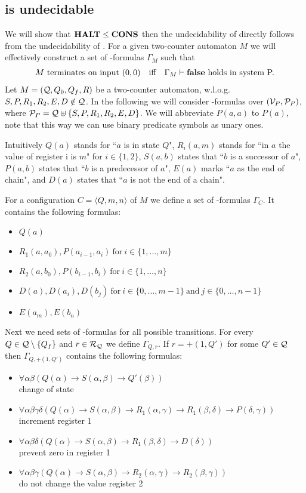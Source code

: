 \subsection{\PCons{} is undecidable}
We will show that $\textbf{HALT}\leq\textbf{CONS}$ then the undecidability of \PCons{} directly follows from the undecidability of \autHalt. For a given two-counter automaton $M$ we will effectively construct a set of \SysP-formulas $\Gamma_M$ such that
\begin{align*}
 & \text{$M$ terminates on input $(0,0)$} &   & \text{iff} & \text{$\Gamma_M\vdash\textbf{false}$ holds in system P.} 
\end{align*}
Let $M=(\mathcal{Q},Q_0,Q_f,R)$ be a two-counter automaton, w.l.o.g. $S,P,R_1,R_2,E,D\notin\mathcal{Q}$. In the following we will consider \SysP-formulas over $(\mathcal{V}_P,\mathcal{P}_P)$, where $\mathcal{P}_P=\mathcal{Q}\uplus\{S,P,R_1,R_2,E,D\}$. We will abbreviate $P(a,a)$ to $P(a)$, note that this way we can use binary predicate symbols as unary ones.

Intuitively $Q(a)$ stands for ``$a$ is in state $Q$", $R_i(a,m)$ stands for ``in $a$ the value of register i is $m$" for $i\in\{1,2\}$, $S(a,b)$ states that ``$b$ is a successor of $a$", $P(a,b)$ states that ``$b$ is a predecessor of $a$", $E(a)$ marks ``$a$ as the end of chain", and $D(a)$ states that ``$a$ is not the end of a chain".

For a configuration $C=\langle Q,m,n\rangle$ of $M$ we define a set of \SysP-formulas $\Gamma_C$. It contains the following formulas:
\begin{itemize}
	\item $Q(a)$
	\item $R_1(a,a_0),P(a_{i-1},a_i)~\text{for}~i\in\{1,\dots,m\}$
	\item $R_2(a,b_0),P(b_{i-1},b_i)~\text{for}~i\in\{1,\dots,n\}$
	\item $D(a),D(a_i),D(b_j)~\text{for}~i\in\{0,\dots,m-1\}~\text{and}~j\in\{0,\dots,n-1\}$
	\item $E(a_m),E(b_n)$
\end{itemize}
Next we need sets of \SysP-formulas for all possible transitions.
For every $Q\in\mathcal{Q}\setminus\{Q_f\}$ and $r\in\mathcal{R}_{\mathcal{Q}}$ we define $\Gamma_{Q,r}$.
If $r=+(1,Q')$ for some $Q'\in\mathcal{Q}$ then $\Gamma_{Q,+(1,Q')}$ contains the following formulas:
\begin{itemize}
	\item $\forall\alpha\beta(Q(\alpha)\to S(\alpha,\beta)\to Q'(\beta))$ \\change of state
	\item $\forall\alpha\beta\gamma\delta(Q(\alpha)\to S(\alpha,\beta)\to R_1(\alpha,\gamma)\to R_1(\beta,\delta)\to P(\delta,\gamma))$\\increment register 1
	\item $\forall\alpha\beta\delta(Q(\alpha)\to S(\alpha,\beta)\to R_1(\beta,\delta)\to D(\delta))$ \\prevent zero in register 1
	\item $\forall\alpha\beta\gamma(Q(\alpha)\to S(\alpha,\beta)\to R_2(\alpha,\gamma)\to R_2(\beta,\gamma))$ \\do not change the value register 2
\end{itemize}


